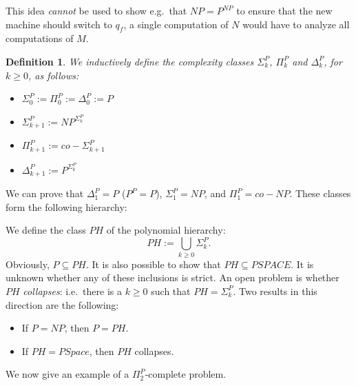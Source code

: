 \documentclass{report}
\newcommand{\NP}{\text{$\mathit{NP}$}\xspace}
\newcommand{\Po}{\text{$\mathit{P}$}\xspace}
\newtheorem{definition}{Definition}[chapter]
\begin{document}
This idea \emph{cannot} be used to show e.g.\ that $\NP = \Po^{\NP}$ to ensure that the new machine should switch to $q_f$, a single computation of $N$ would have to analyze all computations of $M$. 

\begin{definition} We inductively define the complexity classes $\Sigma_k^\Po$, $\Pi_k^\Po$ and $\Delta_k^\Po$, for $k \geq 0$, as follows:
\begin{itemize}
 \item $\Sigma_0^\Po := \Pi_0^\Po := \Delta_0^\Po := P$
 \item $\Sigma_{k+1}^\Po := \NP^{\Sigma_k^\Po}$ 
 \item $\Pi_{k+1}^\Po := co-\Sigma_{k+1}^\Po$
 \item $\Delta_{k+1}^\Po := \Po^{\Sigma_k^\Po}$
\end{itemize}
\end{definition}

We can prove that $\Delta_1^\Po = \Po$ ($\Po^\Po = \Po$), $\Sigma_1^\Po = \NP$, and $\Pi_1^\Po = co-\NP$. These classes form the following hierarchy:
\begin{figure}[!ht]
\newcommand{\hdiff}{4em}
\newcommand{\vdiff}{2em}
\centering
{}
\end{figure}

We define the class $PH$ of the polynomial hierarchy: 
\[PH := \bigcup_{k \geq 0} \Sigma_k^\Po.\]
Obviously, $\Po \subseteq PH$. It is also possible to show that $PH \subseteq PSPACE$. It is unknown whether any of these inclusions is strict. An open problem is whether $PH$ \emph{collapses}: i.e.\, there is a $k \geq 0$ such that $PH = \Sigma_k^\Po$. Two results in this direction are the following:
\begin{itemize}
 \item If $\Po = \NP$, then $\Po = PH$.
 \item If $PH = PSpace$, then $PH$ collapses. 
\end{itemize}
We now give an example of a $\Pi_2^\Po$-complete problem. 
\end{document}
